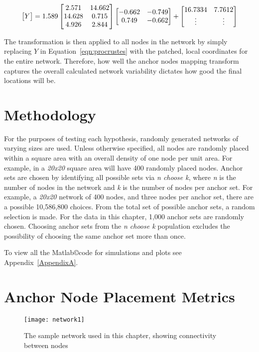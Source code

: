 \begin{equation}\label{eqn:sampleProcrustes1}
\begin{bmatrix}$$Y$$\end{bmatrix}=1.589\begin{bmatrix}
	2.571   & 14.662 \\
   14.628   &  0.715 \\
    4.926   &  2.844\end{bmatrix}\begin{bmatrix}
	-0.662  & -0.749 \\
    0.749   & -0.662\end{bmatrix}+\begin{bmatrix}
16.7334 & 7.7612 \\
\vdots & \vdots$$\end{bmatrix}
\end{equation}

The transformation is then applied to all nodes in the network by simply replacing $Y$ in Equation~\ref{eqn:procrustes} with the patched, local coordinates for the entire network. Therefore, how well the anchor nodes mapping transform captures the overall calculated network variability dictates how good the final locations will be.

\section{Methodology}
For the purposes of testing each hypothesis, randomly generated networks of varying sizes are used.  Unless otherwise specified, all nodes are randomly placed within a square area with an overall density of one node per unit area.  For example, in a \emph{20x20} square area will have 400 randomly placed nodes.  Anchor sets are chosen by identifying all possible sets via \emph{n choose k}, where \emph{n} is the number of nodes in the network and \emph{k} is the number of nodes per anchor set.  For example, a \emph{20x20} network of 400 nodes, and three nodes per anchor set, there are a possible 10,586,800 choices.  From the total set of possible anchor sets, a random selection is made.  For the data in this chapter, 1,000 anchor sets are randomly chosen.  Choosing anchor sets from the \emph{n choose k} population excludes the possibility of choosing the same anchor set more than once.

To view all the Matlab\copyright code for simulations and plots see Appendix~\ref{AppendixA}.

\section{Anchor Node Placement Metrics}
\begin{figure}
	\centering
		\texttt{[image: network1]}
	\caption[The sample network used in this chapter]{The sample network used in this chapter, showing connectivity between nodes}
	\label{fig:HypothesesNetwork}
\end{figure}

